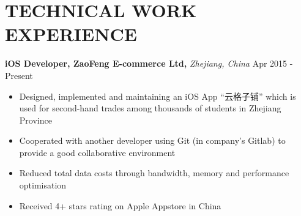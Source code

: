 \documentclass[11pt]{article} %
\begin{document}


\section{TECHNICAL WORK EXPERIENCE}

\hspace{6mm}\textbf{iOS Developer, ZaoFeng E-commerce Ltd,} \textit{Zhejiang, China} \hfill Apr 2015 - Present
\begin{itemize}[leftmargin=16mm]        
        \item Designed, implemented and maintaining an iOS App ``云格子铺'' which is used for second-hand trades among thousands of students in Zhejiang Province
		\vspace{-2mm}
        \item Cooperated with another developer using Git (in company's Gitlab) to provide a good collaborative environment
		\vspace{-2mm}
        \item Reduced total data costs through bandwidth, memory and performance optimisation
		\vspace{-2mm}
        \item Received 4+ stars rating on Apple Appstore in China
\end{itemize}
\end{document}
